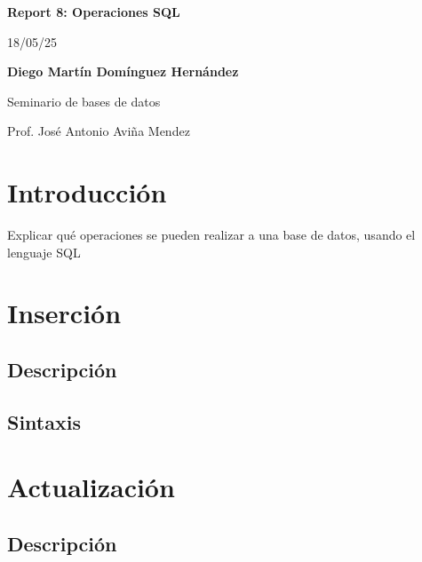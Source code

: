 \documentclass[12pt, a4paper]{article}
\begin{document}
\begin{titlepage}
\end{titlepage}

\begin{titlepage}
\begin{center}
 {\Huge\bfseries Report 8: Operaciones SQL\\}
 \vspace{1cm}

 {\huge 18/05/25\\}
 \vspace{2cm}

 {\Large\bfseries Diego Martín Domínguez Hernández}\\[5pt]
 \vspace{2cm}

 {\Large Seminario de bases de datos}\\[5pt]
 \vspace{2cm}

 {\Large Prof. José Antonio Aviña Mendez}\\[5pt]
\end{center}
\end{titlepage}

\newpage
\tableofcontents
\newpage

\section{Introducción}
Explicar qué operaciones se pueden realizar a una base de datos, usando el lenguaje SQL

\section{Inserción}
\subsection{Descripción}
\subsection{Sintaxis}

\section{Actualización}
\subsection{Descripción}
\end{document}
